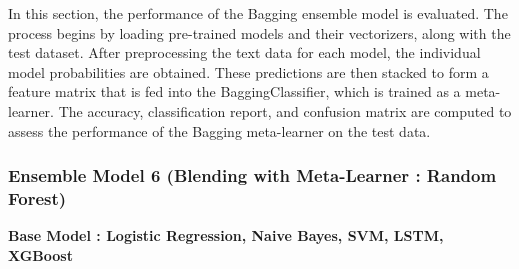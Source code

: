\noindent
In this section, the performance of the Bagging ensemble model is evaluated. The process begins by loading pre-trained models and their vectorizers, along with the test dataset. After preprocessing the text data for each model, the individual model probabilities are obtained. These predictions are then stacked to form a feature matrix that is fed into the BaggingClassifier, which is trained as a meta-learner. The accuracy, classification report, and confusion matrix are computed to assess the performance of the Bagging meta-learner on the test data.


\subsubsection{Ensemble Model 6 (Blending with Meta-Learner : Random Forest)}

\textbf{Base Model : Logistic Regression, Naive Bayes, SVM, LSTM, XGBoost}

